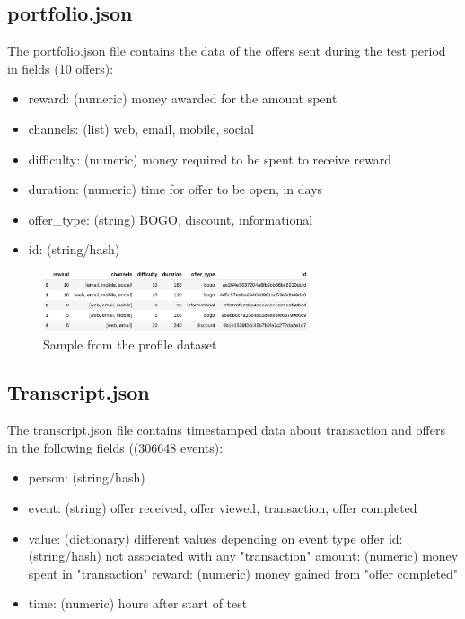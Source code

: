 \subsection*{portfolio.json}
The portfolio.json file contains the data of the offers sent during the test period in fields (10 offers): 
\begin{itemize}
	\item reward: (numeric) money awarded for the amount spent
	\item channels: (list) web, email, mobile, social
	\item difficulty: (numeric) money required to be spent to receive reward
	\item duration: (numeric) time for offer to be open, in days
	\item offer\_type: (string) BOGO, discount, informational
	\item id: (string/hash)
\end{itemize}

\begin{figure}[h]
	\centering
	\includegraphics[width=0.7\textwidth]{fig/portfolio_head.jpg}
	\vspace*{-0.1in}
	\caption{Sample from the profile dataset}
	\label{fig2}
	\vspace*{-0.2in}
	\bigskip
\end{figure}

\subsection*{Transcript.json}
The transcript.json file contains timestamped data about transaction and offers in the following fields ((306648 events):
\begin{itemize}
	\item person: (string/hash)
	\item event: (string) offer received, offer viewed, transaction, offer completed
	\item value: (dictionary) different values depending on event type
	\subitem offer id: (string/hash) not associated with any "transaction"
	\subitem amount: (numeric) money spent in "transaction"
	\subitem reward: (numeric) money gained from "offer completed"
	\item time: (numeric) hours after start of test
\end{itemize}

